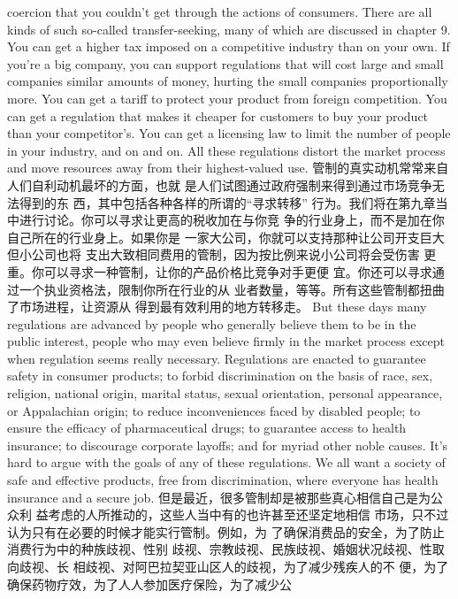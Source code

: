 \begin{paracol}{2}
coercion that you couldn't get through the actions of consumers. There are all kinds of such so-called transfer-seeking,
many of which are discussed in chapter 9. You can get a higher
tax imposed on a competitive industry than on your own. If
you're a big company, you can support regulations that will cost
large and small companies similar amounts of money, hurting
the small companies proportionally more. You can get a tariff to
protect your product from foreign competition. You can get a regulation that makes it cheaper for customers to buy your
product than your competitor's. You can get a licensing law to
limit the number of people in your industry, and on and on. All
these regulations distort the market process and move resources
away from their highest-valued use.
\switchcolumn
管制的真实动机常常来自人们自利动机最坏的方面，也就
是人们试图通过政府强制来得到通过市场竞争无法得到的东
西，其中包括各种各样的所谓的“寻求转移” 行为。我们将在第九章当中进行讨论。你可以寻求让更高的税收加在与你竞
争的行业身上，而不是加在你自己所在的行业身上。如果你是
一家大公司，你就可以支持那种让公司开支巨大但小公司也将
支出大致相同费用的管制，因为按比例来说小公司将会受伤害
更重。你可以寻求一种管制，让你的产品价格比竞争对手更便
宜。你还可以寻求通过一个执业资格法，限制你所在行业的从
业者数量，等等。所有这些管制都扭曲了市场进程，让资源从
得到最有效利用的地方转移走。
\switchcolumn*
But these days many regulations are advanced by people
who generally believe them to be in the public interest, people
who may even believe firmly in the market process except when
regulation seems really necessary. Regulations are enacted to
guarantee safety in consumer products; to forbid discrimination
on the basis of race, sex, religion, national origin, marital status,
sexual orientation, personal appearance, or Appalachian origin;
to reduce inconveniences faced by disabled people; to ensure
the efficacy of pharmaceutical drugs; to guarantee access to
health insurance; to discourage corporate layoffs; and for myriad other noble causes. It's hard to argue with the goals of any
of these regulations. We all want a society of safe and effective
products, free from discrimination, where everyone has health
insurance and a secure job.
\switchcolumn
但是最近，很多管制却是被那些真心相信自己是为公众利
益考虑的人所推动的，这些人当中有的也许甚至还坚定地相信
市场，只不过认为只有在必要的时候才能实行管制。例如，为
了确保消费品的安全，为了防止消费行为中的种族歧视、性别
歧视、宗教歧视、民族歧视、婚姻状况歧视、性取向歧视、长
相歧视、对阿巴拉契亚山区人的歧视，为了减少残疾人的不
便，为了确保药物疗效，为了人人参加医疗保险，为了减少公

\end{paracol}
